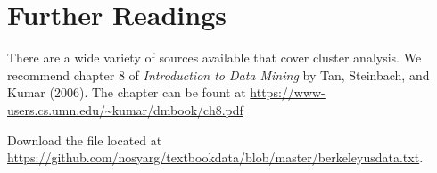 \section{Further Readings}

There are a wide variety of sources available that cover cluster analysis.
We recommend chapter 8 of \emph{Introduction to Data Mining} by Tan, Steinbach, and Kumar (2006).
The chapter can be fount at \url{https://www-users.cs.umn.edu/~kumar/dmbook/ch8.pdf}

Download the file located at \url{https://github.com/nosyarg/textbookdata/blob/master/berkeleyusdata.txt}.
